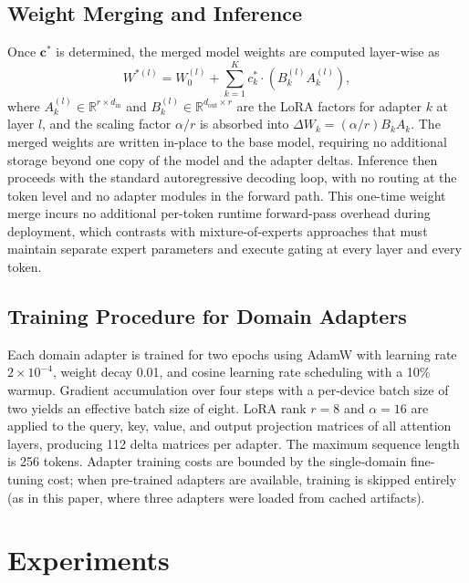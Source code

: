 \documentclass[preprint,12pt]{elsarticle}
\begin{document}
\subsection{Weight Merging and Inference}
\label{subsec:merge}

Once $\mathbf{c}^*$ is determined, the merged model weights are computed
layer-wise as
\begin{equation}
    W^{*(l)} = W_0^{(l)} + \sum_{k=1}^{K} c_k^* \cdot
    (B_k^{(l)} A_k^{(l)}),
    \label{eq:layer_merge}
\end{equation}
where $A_k^{(l)} \in \mathbb{R}^{r \times d_{\text{in}}}$ and
$B_k^{(l)} \in \mathbb{R}^{d_{\text{out}} \times r}$ are the LoRA factors for
adapter $k$ at layer $l$, and the scaling factor $\alpha / r$ is absorbed into
$\Delta W_k = (\alpha / r) B_k A_k$. The merged weights are written in-place to
the base model, requiring no additional storage beyond one copy of the model
and the adapter deltas. Inference then proceeds with the standard autoregressive
decoding loop, with no routing at the token level and no adapter modules in the
forward path. This one-time weight merge incurs no additional per-token runtime
forward-pass overhead during deployment, which contrasts with mixture-of-experts
approaches that must maintain separate expert parameters and execute gating at
every layer and every token.

\subsection{Training Procedure for Domain Adapters}
\label{subsec:training}

Each domain adapter is trained for two epochs using AdamW with learning rate
$2 \times 10^{-4}$, weight decay 0.01, and cosine learning rate scheduling
with a 10\% warmup. Gradient accumulation over four steps with a per-device
batch size of two yields an effective batch size of eight. LoRA rank $r = 8$
and $\alpha = 16$ are applied to the query, key, value, and output projection
matrices of all attention layers, producing 112 delta matrices per adapter.
The maximum sequence length is 256 tokens. Adapter training costs are bounded
by the single-domain fine-tuning cost; when pre-trained adapters are available,
training is skipped entirely (as in this paper, where three adapters were loaded
from cached artifacts).

\section{Experiments}
\label{sec:experiments}
\end{document}
